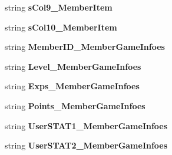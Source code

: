 \begin{DoxyCompactItemize}
\item 
string {\bfseries s\+Col9\+\_\+\+Member\+Item}\hypertarget{a00005_add258233e626ff1e7617aba9f4b998f0}{}\label{a00005_add258233e626ff1e7617aba9f4b998f0}

\item 
string {\bfseries s\+Col10\+\_\+\+Member\+Item}\hypertarget{a00005_a48e16a1577d857a6c7e6392834450b85}{}\label{a00005_a48e16a1577d857a6c7e6392834450b85}

\item 
string {\bfseries Member\+I\+D\+\_\+\+Member\+Game\+Infoes}\hypertarget{a00005_a8f91f3bb38bb1bbaf3e64a4f66709731}{}\label{a00005_a8f91f3bb38bb1bbaf3e64a4f66709731}

\item 
string {\bfseries Level\+\_\+\+Member\+Game\+Infoes}\hypertarget{a00005_abd3095d45f1d43f4b75e3e81d4651e75}{}\label{a00005_abd3095d45f1d43f4b75e3e81d4651e75}

\item 
string {\bfseries Exps\+\_\+\+Member\+Game\+Infoes}\hypertarget{a00005_aab395cd9dfffc93cf531bff8f84dac0d}{}\label{a00005_aab395cd9dfffc93cf531bff8f84dac0d}

\item 
string {\bfseries Points\+\_\+\+Member\+Game\+Infoes}\hypertarget{a00005_ac86b4fd7e02e52e653adfb78575aff03}{}\label{a00005_ac86b4fd7e02e52e653adfb78575aff03}

\item 
string {\bfseries User\+S\+T\+A\+T1\+\_\+\+Member\+Game\+Infoes}\hypertarget{a00005_a8a2c19ce5f4c820258f605e347c51945}{}\label{a00005_a8a2c19ce5f4c820258f605e347c51945}

\item 
string {\bfseries User\+S\+T\+A\+T2\+\_\+\+Member\+Game\+Infoes}\hypertarget{a00005_a0b9b7efcf68061b41a37efd9fdda9c5e}{}\label{a00005_a0b9b7efcf68061b41a37efd9fdda9c5e}


\end{DoxyCompactItemize}
